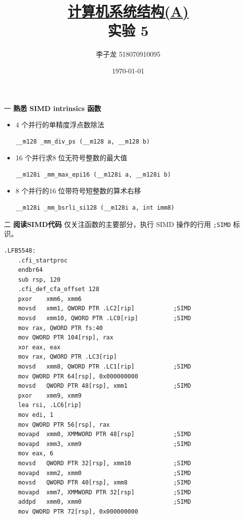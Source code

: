 \documentclass[12pt,a4paper]{article}
\newenvironment{problems}{\begin{list}{}{\renewcommand{\makelabel}[1]{\textbf{##1}.\hfil}}}{\end{list}}
\begin{document}
\title{\normalsize \underline{计算机系统结构(A)}\\\LARGE 实验 5}
\author{李子龙 518070910095}
\date{\today}
\maketitle

\begin{problems}
    \item[一] \textbf{熟悉 SIMD intrinsics 函数}
    \begin{itemize}
        \item 4 个并行的单精度浮点数除法
        \begin{lstlisting}[identifierstyle=\color{blue}]
            __m128 _mm_div_ps (__m128 a, __m128 b)
        \end{lstlisting}
        \item 16 个并行求8 位无符号整数的最大值
        \begin{lstlisting}[identifierstyle=\color{blue}]
            __m128i _mm_max_epi16 (__m128i a, __m128i b)
        \end{lstlisting}
        \item 8 个并行的16 位带符号短整数的算术右移
        \begin{lstlisting}[identifierstyle=\color{blue}]
            __m128i _mm_bsrli_si128 (__m128i a, int imm8)
        \end{lstlisting}
    \end{itemize}
    \item[二] \textbf{阅读SIMD代码}
    仅关注函数的主要部分，执行 SIMD 操作的行用 \verb";SIMD" 标识。
    \lstset{language=[x86masm]Assembler}
	\begin{multicols}{2}
		\begin{lstlisting}
.LFB5548:
	.cfi_startproc
	endbr64
	sub	rsp, 120
	.cfi_def_cfa_offset 128
	pxor	xmm6, xmm6
	movsd	xmm1, QWORD PTR .LC2[rip]			;SIMD
	movsd	xmm10, QWORD PTR .LC0[rip]			;SIMD
	mov	rax, QWORD PTR fs:40
	mov	QWORD PTR 104[rsp], rax
	xor	eax, eax
	mov	rax, QWORD PTR .LC3[rip]
	movsd	xmm8, QWORD PTR .LC1[rip]			;SIMD
	mov	QWORD PTR 64[rsp], 0x000000000
	movsd	QWORD PTR 48[rsp], xmm1				;SIMD
	pxor	xmm9, xmm9
	lea	rsi, .LC6[rip]
	mov	edi, 1
	mov	QWORD PTR 56[rsp], rax
	movapd	xmm0, XMMWORD PTR 48[rsp]			;SIMD
	movapd	xmm3, xmm9							;SIMD
	mov	eax, 6
	movsd	QWORD PTR 32[rsp], xmm10			;SIMD
	movapd	xmm2, xmm0							;SIMD
	movsd	QWORD PTR 40[rsp], xmm8				;SIMD
	movapd	xmm7, XMMWORD PTR 32[rsp]			;SIMD
	addpd	xmm0, xmm0							;SIMD
	mov	QWORD PTR 72[rsp], 0x000000000

\end{lstlisting}
\end{multicols}
\end{problems}
\end{document}
